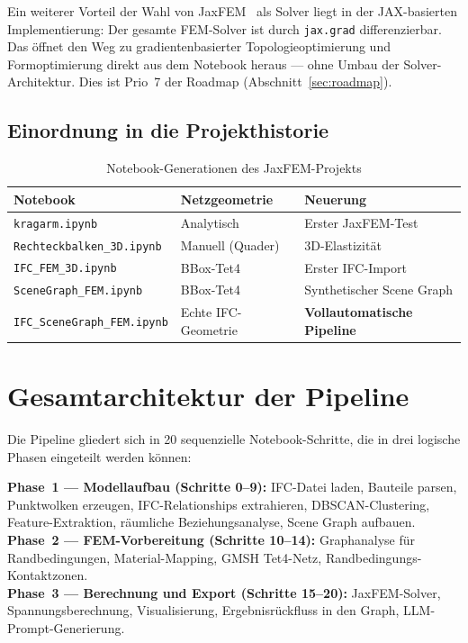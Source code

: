 \documentclass[a4paper,11pt]{article}
\begin{document}
Ein weiterer Vorteil der Wahl von JaxFEM~\cite{jaxfem} als Solver liegt in der JAX-basierten Implementierung: Der gesamte FEM-Solver ist durch \texttt{jax.grad} differenzierbar. Das öffnet den Weg zu gradientenbasierter Topologieoptimierung und Formoptimierung direkt aus dem Notebook heraus — ohne Umbau der Solver-Architektur. Dies ist Prio~7 der Roadmap (Abschnitt~\ref{sec:roadmap}).

\subsection{Einordnung in die Projekthistorie}

\begin{table}[H]
\centering
\caption{Notebook-Generationen des JaxFEM-Projekts}
\begin{tabular}{lll}
\toprule
\textbf{Notebook} & \textbf{Netzgeometrie} & \textbf{Neuerung} \\
\midrule
\texttt{kragarm.ipynb} & Analytisch & Erster JaxFEM-Test \\
\texttt{Rechteckbalken\_3D.ipynb} & Manuell (Quader) & 3D-Elastizität \\
\texttt{IFC\_FEM\_3D.ipynb} & BBox-Tet4 & Erster IFC-Import \\
\texttt{SceneGraph\_FEM.ipynb} & BBox-Tet4 & Synthetischer Scene Graph \\
\texttt{IFC\_SceneGraph\_FEM.ipynb} & Echte IFC-Geometrie & \textbf{Vollautomatische Pipeline} \\
\bottomrule
\end{tabular}
\end{table}

\section{Gesamtarchitektur der Pipeline}

Die Pipeline gliedert sich in 20 sequenzielle Notebook-Schritte, die in drei logische Phasen eingeteilt werden können:

\begin{infobox}[title={Phasenübersicht}]
\textbf{Phase~1 — Modellaufbau (Schritte 0–9):} IFC-Datei laden, Bauteile parsen, Punktwolken erzeugen, IFC-Relationships extrahieren, DBSCAN-Clustering, Feature-Extraktion, räumliche Beziehungsanalyse, Scene Graph aufbauen.\\[4pt]
\textbf{Phase~2 — FEM-Vorbereitung (Schritte 10–14):} Graphanalyse für Randbedingungen, Material-Mapping, GMSH Tet4-Netz, Randbedingungs-Kontaktzonen.\\[4pt]
\textbf{Phase~3 — Berechnung und Export (Schritte 15–20):} JaxFEM-Solver, Spannungsberechnung, Visualisierung, Ergebnisrückfluss in den Graph, LLM-Prompt-Generierung.
\end{infobox}
\end{document}
